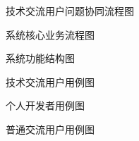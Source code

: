
\begin{figure}[H]
\centering

\caption{技术交流用户问题协同流程图}
\label{fig:3-1}
\end{figure}

\begin{figure}[H]
\centering

\caption{系统核心业务流程图}
\label{fig:3-2}
\end{figure}

\begin{figure}[H]
\centering

\caption{系统功能结构图}
\label{fig:3-3}
\end{figure}

\begin{figure}[H]
\centering

\caption{技术交流用户用例图}
\label{fig:3-4}
\end{figure}

\begin{figure}[H]
\centering

\caption{个人开发者用例图}
\label{fig:3-5}
\end{figure}

\begin{figure}[H]
\centering

\caption{普通交流用户用例图}
\label{fig:3-6}
\end{figure}
